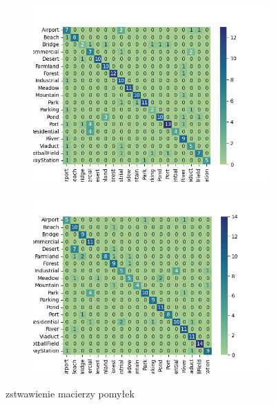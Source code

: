 \documentclass[12pt,twoside]{article}
\begin{document}
\begin{figure}[ht]
	\centering
	\begin{subfigure}[b]{0.45\textwidth}
	  \includegraphics[width=\textwidth]{figures/cmv3_exp2.png}
	  \label{fig:obraz1}
	\end{subfigure}
	\hfill
	\begin{subfigure}[b]{0.45\textwidth}
	  \includegraphics[width=\textwidth]{figures/cmMM_exp2.png}
	 
	  \label{fig:obraz2}
	\end{subfigure}
	\caption{zstwawienie macierzy pomyłek}
	
\end{figure}
\end{document}
